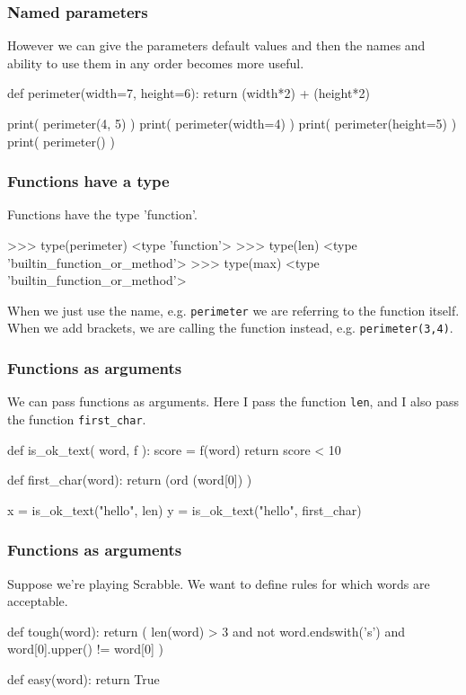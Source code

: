 \documentclass{beamer}
\begin{document}
\begin{frame}[fragile]
\frametitle{Named parameters}
However we can give the parameters default values and then the names
and ability to use them in any order becomes more useful.
\begin{code}
def perimeter(width=7, height=6):
   return (width*2) + (height*2)

print( perimeter(4, 5) )  
print( perimeter(width=4) )  
print( perimeter(height=5) ) 
print( perimeter() )  
\end{code}
\end{frame}



\begin{frame}[fragile]
\frametitle{Functions have a type}
Functions have the type 'function'.
\begin{code}
>>> type(perimeter)
<type 'function'>
>>> type(len)
<type 'builtin_function_or_method'>
>>> type(max)
<type 'builtin_function_or_method'>
\end{code}
When we just use the name, e.g. \texttt{perimeter} we are referring
to the function itself. When we add brackets, we are calling the
function instead, e.g.  \texttt{perimeter(3,4)}.
\end{frame}



\begin{frame}[fragile]
\frametitle{Functions as arguments}
We can pass functions as arguments. Here I pass the function \texttt{len}, and
I also pass the function \texttt{first\_char}.
\begin{code}
def is_ok_text( word, f ):
   score = f(word)
   return score < 10

def first_char(word):
   return (ord (word[0]) )

x = is_ok_text("hello", len)
y = is_ok_text("hello", first_char)
\end{code}
\end{frame}

\begin{frame}[fragile]
\frametitle{Functions as arguments}
Suppose we're playing Scrabble. We want to define rules for which
words are acceptable. 
\begin{code}
def tough(word):
   return ( len(word) > 3
            and not word.endswith('s')
            and word[0].upper() != word[0] )

def easy(word):
   return True
\end{code}
\end{frame}
\end{document}
